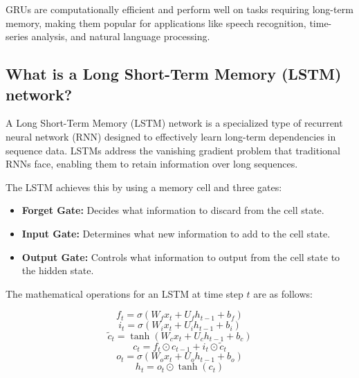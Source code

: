 GRUs are computationally efficient and perform well on tasks requiring long-term memory, making them popular for applications like speech recognition, time-series analysis, and natural language processing.


\subsection{What is a Long Short-Term Memory (LSTM) network?}

A Long Short-Term Memory (LSTM) network is a specialized type of recurrent neural network (RNN) designed to effectively learn long-term dependencies in sequence data. LSTMs address the vanishing gradient problem that traditional RNNs face, enabling them to retain information over long sequences.

The LSTM achieves this by using a memory cell and three gates:

\begin{itemize}
    \item \textbf{Forget Gate:} Decides what information to discard from the cell state.
    \item \textbf{Input Gate:} Determines what new information to add to the cell state.
    \item \textbf{Output Gate:} Controls what information to output from the cell state to the hidden state.
\end{itemize}

The mathematical operations for an LSTM at time step \( t \) are as follows:

\[
f_t = \sigma(W_f x_t + U_f h_{t-1} + b_f)
\]
\[
i_t = \sigma(W_i x_t + U_i h_{t-1} + b_i)
\]
\[
\tilde{c}_t = \tanh(W_c x_t + U_c h_{t-1} + b_c)
\]
\[
c_t = f_t \odot c_{t-1} + i_t \odot \tilde{c}_t
\]
\[
o_t = \sigma(W_o x_t + U_o h_{t-1} + b_o)
\]
\[
h_t = o_t \odot \tanh(c_t)
\]

